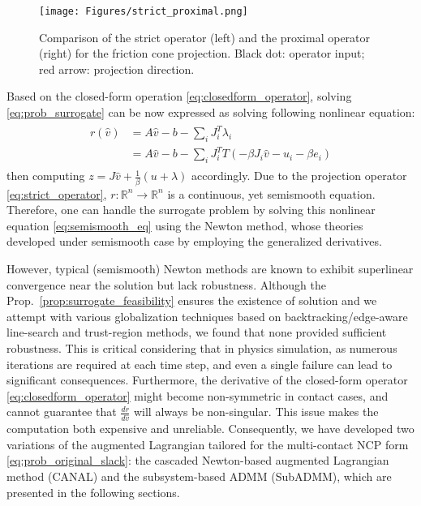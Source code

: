 \documentclass[lettersize,journal]{IEEEtran}
\begin{document}
\begin{figure}[t]
\centering
\texttt{[image: Figures/strict\_proximal.png]}
\caption{Comparison of the strict operator (left) and the proximal operator (right) for the friction cone projection. Black dot: operator input; red arrow: projection direction.}
\label{fig:strict_proximal}
\end{figure}

Based on the closed-form operation \eqref{eq:closedform_operator}, solving \eqref{eq:prob_surrogate} can be now expressed as solving following nonlinear equation:
\begin{align} \label{eq:semismooth_eq}
\begin{split}
r(\hat{v})
&= A\hat{v} - b - \sum_i J_i^T \lambda_i \\
&= A\hat{v} - b - \sum_i J_i^T T(-\beta J_i\hat{v}-u_i-\beta e_i)
\end{split}
\end{align}
then computing $z=J\hat{v}+\frac{1}{\beta}(u+\lambda)$ accordingly.
Due to the projection operator \eqref{eq:strict_operator}, $r:\mathbb{R}^n\rightarrow\mathbb{R}^n$ is a continuous, yet semismooth equation.
Therefore, one can handle the surrogate problem by solving this nonlinear equation \eqref{eq:semismooth_eq} using the Newton method, whose theories developed under semismooth case \cite{hintermuller2010semismooth} by employing the generalized derivatives. 

However, typical (semismooth) Newton methods are known to exhibit superlinear convergence near the solution but lack robustness. 
Although the Prop.~\ref{prop:surrogate_feasibility} ensures the existence of solution and we attempt with various globalization techniques based on backtracking/edge-aware line-search and trust-region methods, we found that none provided sufficient robustness. 
This is critical considering that in physics simulation, as numerous iterations are required at each time step, and even a single failure can lead to significant consequences.
Furthermore, the derivative of the closed-form operator \eqref{eq:closedform_operator} might become non-symmetric in contact cases, and cannot guarantee that $\frac{dr}{d\hat{v}}$ will always be non-singular. This issue makes the computation both expensive and unreliable. 
Consequently, we have developed two variations of the augmented Lagrangian tailored for the multi-contact NCP form \eqref{eq:prob_original_slack}: the cascaded Newton-based augmented Lagrangian method (CANAL) and the subsystem-based ADMM (SubADMM), which are presented in the following sections.
\end{document}
